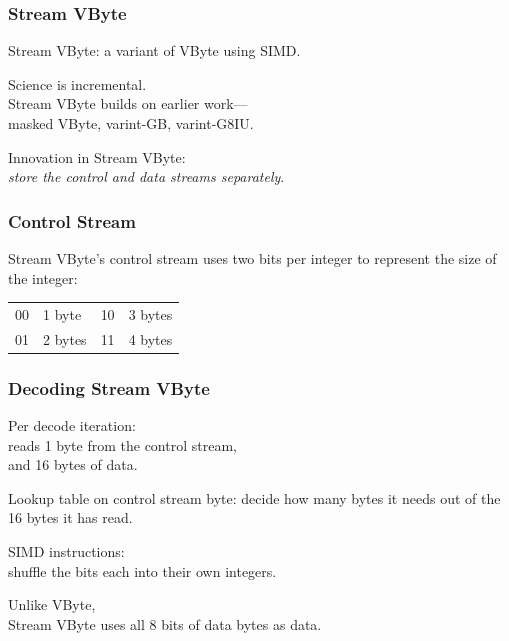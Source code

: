 \begin{frame}
\frametitle{Stream VByte}
\vspace*{-2em}
\begin{changemargin}{2cm}
Stream VByte: a variant of VByte using SIMD.


Science is incremental. \\
Stream VByte builds on earlier work---\\
\hspace*{2em}masked VByte, {\sc varint}-GB, {\sc varint}-G8IU. 

Innovation in Stream VByte:\\
\hspace*{2em}\emph{store the control and data streams separately}.
\end{changemargin}

\end{frame}

\begin{frame}
\frametitle{Control Stream}
\vspace*{-4em}
\begin{changemargin}{2cm}
Stream VByte's control stream uses two bits per integer to represent the size of the integer:
\begin{center}
\vspace*{-3em}
\begin{tabular}{ll@{~~~~~~~~}ll}
00 & 1 byte & 10 & 3 bytes\\
01 & 2 bytes & 11 & 4 bytes
\end{tabular}
\end{center}
\end{changemargin}

\end{frame}


\begin{frame}
\frametitle{Decoding Stream VByte}

\begin{changemargin}{2cm}
Per decode iteration:\\
\hspace*{2em} reads 1 byte from the control stream,\\
\hspace*{2em} and 16 bytes of data.


Lookup table on control stream byte: decide how many
bytes it needs out of the 16 bytes it has read.

SIMD instructions: \\
\hspace*{2em}shuffle the bits each into their own integers. 

Unlike VByte, \\
Stream VByte uses all 8 bits
of data bytes as data.
\end{changemargin}

\end{frame}



